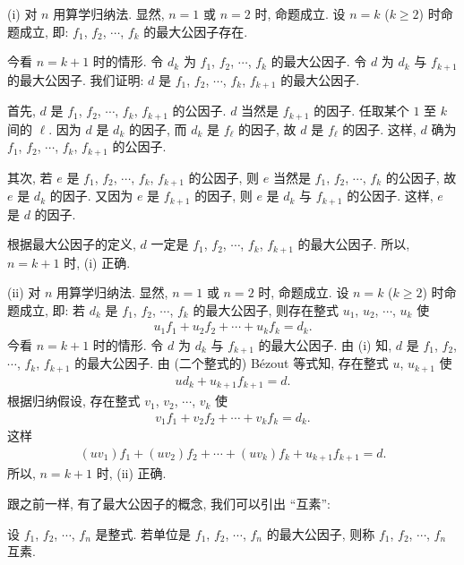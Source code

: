 \begin{pf}
    (i) 对 $n$ 用算学归纳法. 显然, $n = 1$ 或 $n = 2$ 时, 命题成立. 设 $n = k$ ($k \geq 2$) 时命题成立, 即: $f_1$, $f_2$, $\cdots$, $f_k$ 的最大公因子存在.

    今看 $n = k+1$ 时的情形. 令 $d_k$ 为 $f_1$, $f_2$, $\cdots$, $f_k$ 的最大公因子. 令 $d$ 为 $d_k$ 与 $f_{k+1}$ 的最大公因子. 我们证明: $d$ 是 $f_1$, $f_2$, $\cdots$, $f_k$, $f_{k+1}$ 的最大公因子.

    首先, $d$ 是 $f_1$, $f_2$, $\cdots$, $f_k$, $f_{k+1}$ 的公因子. $d$ 当然是 $f_{k+1}$ 的因子. 任取某个 $1$ 至 $k$ 间的 $\ell$. 因为 $d$ 是 $d_k$ 的因子, 而 $d_k$ 是 $f_{\ell}$ 的因子, 故 $d$ 是 $f_{\ell}$ 的因子. 这样, $d$ 确为 $f_1$, $f_2$, $\cdots$, $f_k$, $f_{k+1}$ 的公因子.

    其次, 若 $e$ 是 $f_1$, $f_2$, $\cdots$, $f_k$, $f_{k+1}$ 的公因子, 则 $e$ 当然是 $f_1$, $f_2$, $\cdots$, $f_{k}$ 的公因子, 故 $e$ 是 $d_k$ 的因子. 又因为 $e$ 是 $f_{k+1}$ 的因子, 则 $e$ 是 $d_k$ 与 $f_{k+1}$ 的公因子. 这样, $e$ 是 $d$ 的因子.

    根据最大公因子的定义, $d$ 一定是 $f_1$, $f_2$, $\cdots$, $f_k$, $f_{k+1}$ 的最大公因子. 所以, $n = k+1$ 时, (i) 正确.

    (ii) 对 $n$ 用算学归纳法. 显然, $n = 1$ 或 $n = 2$ 时, 命题成立. 设 $n = k$ ($k \geq 2$) 时命题成立, 即: 若 $d_k$ 是 $f_1$, $f_2$, $\cdots$, $f_k$ 的最大公因子, 则存在整式 $u_1$, $u_2$, $\cdots$, $u_k$ 使
    \begin{align*}
        u_1 f_1 + u_2 f_2 + \cdots + u_k f_k = d_k.
    \end{align*}
    今看 $n = k+1$ 时的情形. 令 $d$ 为 $d_k$ 与 $f_{k+1}$ 的最大公因子. 由 (i) 知, $d$ 是 $f_1$, $f_2$, $\cdots$, $f_k$, $f_{k+1}$ 的最大公因子. 由 (二个整式的) Bézout 等式知, 存在整式 $u$, $u_{k+1}$ 使
    \begin{align*}
        u d_k + u_{k+1} f_{k+1} = d.
    \end{align*}
    根据归纳假设, 存在整式 $v_1$, $v_2$, $\cdots$, $v_k$ 使
    \begin{align*}
        v_1 f_1 + v_2 f_2 + \cdots + v_k f_k = d_k.
    \end{align*}
    这样
    \begin{align*}
        (uv_1) f_1 + (uv_2) f_2 + \cdots + (uv_k) f_k + u_{k+1} f_{k+1} = d.
    \end{align*}
    所以, $n = k+1$ 时, (ii) 正确.
\end{pf}

跟之前一样, 有了最大公因子的概念, 我们可以引出 ``互素'':
\begin{definition}
    设 $f_1$, $f_2$, $\cdots$, $f_n$ 是整式. 若单位是 $f_1$, $f_2$, $\cdots$, $f_n$ 的最大公因子, 则称 $f_1$, $f_2$, $\cdots$, $f_n$ 互素.
\end{definition}

